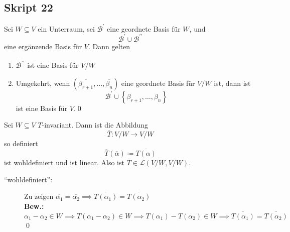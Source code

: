 \subsection{Skript 22}
\begin{sublemma}
	Sei $ W \subseteq V $ ein Unterraum, sei $ \mathcal{B} ^\prime  $ eine geordnete Basis für $ W $, und
	\[
		\mathcal{B} ^\prime \cup \mathcal{B} ^{\prime\prime} 
	\]
	eine ergänzende Basis für $ V $.
	Dann gelten
	\begin{enumerate}[label=(\roman*)]
		\item $ \overline{\mathcal{B} ^{\prime\prime}}  $ ist eine Basis für $ V / W $ 
		\item Umgekehrt, wenn $ \left( \overline{\beta_{r + 1} }, \dotsc, \overline{\beta_n}  \right)  $ eine geordnete Basis für $ V / W $ ist, dann ist
			\[
				\mathcal{B} ^\prime  \cup \left\{ \beta_{r + 1} , \dotsc, \beta_n \right\} 
			\]
			ist eine Basis für $ V $.\qed
	\end{enumerate}
\end{sublemma}

\begin{subnote*}
	Sei $ W \subseteq V $ $ T $-invariant.
	Dann ist die Abbildung
	\[
		\overline{T} : V / W \to V / W
	\]
	so definiert
	\[
		\overline{T} \left( \overline{\alpha}  \right) \coloneqq \overline{T ( \alpha )} 
	\]
	ist wohldefiniert und ist linear.
	Also ist $ \overline{T} \in \mathcal{L} \left( V / W, V / W \right)  $.
	\begin{subproof*}
		\begin{description}
			\item[``wohldefiniert'':] Zu zeigen
				$ \overline{\alpha_1} = \overline{\alpha_2} \implies  \overline{T(\alpha_1)} = \overline{T\left( \alpha_2 \right) } $\\
				\textbf{Bew.:}
				$ \alpha_1 - \alpha_2 \in W \implies T(\alpha_1 - \alpha_2) \in W \implies T(\alpha_1) - T(\alpha_2) \in W \implies \overline{T(\alpha_1)} = \overline{T(\alpha_2)}  $\qed
		\end{description}
	\end{subproof*}
\end{subnote*}

